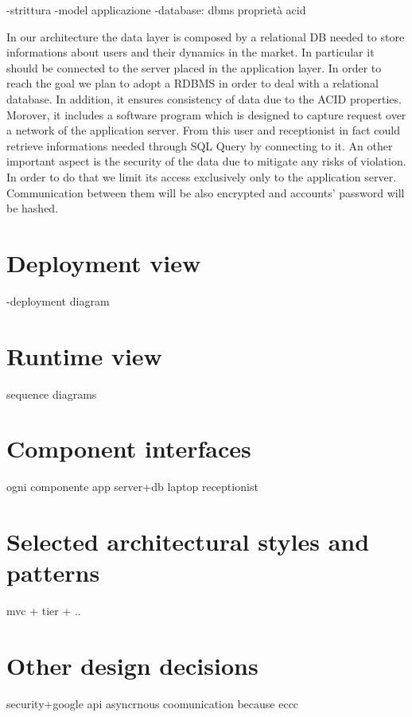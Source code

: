 -strittura
-model applicazione
-database: dbms proprietà acid


In our architecture the data layer is composed by a relational DB needed to store informations about users and their dynamics in the market. In particular it should be connected to the server placed in the application layer. In order to reach the goal we plan to adopt a RDBMS in order to deal with a relational database. In addition, it ensures 
consistency of data due to the ACID properties.
Morover, it includes a software program which is designed to capture request over a network of the application server. From this user and receptionist in fact could retrieve informations needed through SQL Query by connecting to it.  
An other important aspect is the security of the data due to mitigate any risks of violation. In order to do that we limit its access exclusively only to the application server. Communication between them will be also encrypted and accounts' password will be hashed.




\section{Deployment view}
-deployment diagram

\section{Runtime view}
sequence diagrams

\section{Component interfaces}
ogni componente
app
server+db
laptop receptionist

\section{Selected architectural styles and patterns}
mvc + tier + ..

\section{Other design decisions}

security+google api
asyncrnous coomunication because eccc
